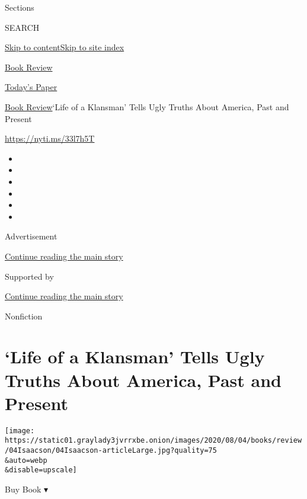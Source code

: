 Sections

SEARCH

\protect\hyperlink{site-content}{Skip to
content}\protect\hyperlink{site-index}{Skip to site index}

\href{https://www.nytimes3xbfgragh.onion/section/books/review}{Book
Review}

\href{https://myaccount.nytimes3xbfgragh.onion/auth/login?response_type=cookie\&client_id=vi}{}

\href{https://www.nytimes3xbfgragh.onion/section/todayspaper}{Today's
Paper}

\href{/section/books/review}{Book Review}\textbar{}`Life of a Klansman'
Tells Ugly Truths About America, Past and Present

\url{https://nyti.ms/33l7h5T}

\begin{itemize}
\item
\item
\item
\item
\item
\item
\end{itemize}

Advertisement

\protect\hyperlink{after-top}{Continue reading the main story}

Supported by

\protect\hyperlink{after-sponsor}{Continue reading the main story}

Nonfiction

\hypertarget{life-of-a-klansman-tells-ugly-truths-about-america-past-and-present}{%
\section{`Life of a Klansman' Tells Ugly Truths About America, Past and
Present}\label{life-of-a-klansman-tells-ugly-truths-about-america-past-and-present}}

\texttt{[image: https://static01.graylady3jvrrxbe.onion/images/2020/08/04/books/review/04Isaacson/04Isaacson-articleLarge.jpg?quality=75\\\&auto=webp\\\&disable=upscale]}

Buy Book ▾

